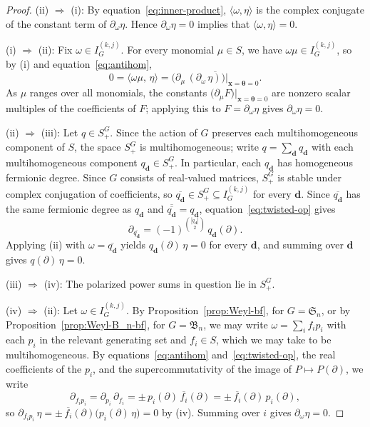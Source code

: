 \documentclass[12pt]{amsart}
\theoremstyle{plain}
\theoremstyle{definition}
\begin{document}
\begin{proof}
(ii) $\Rightarrow$ (i): By equation~\eqref{eq:inner-product}, $\langle \omega, \eta\rangle$ is the complex conjugate of the constant term of $\partial_\omega \eta$. 
Hence $\partial_\omega \eta = 0$ implies that $\langle \omega, \eta\rangle = 0$.

(i) $\Rightarrow$ (ii): Fix $\omega \in I_G^{(k,j)}$. For every monomial $\mu \in S$, we have $\omega \mu \in I_G^{(k,j)}$, so by (i) and equation~\eqref{eq:antihom},
\begin{equation}
    0 = \langle \omega\mu,\, \eta \rangle
      = \overline{\big(\partial_\mu\, (\partial_\omega\, \eta)\big)\big|_{\bm{x} = \bm{\theta} = 0}}.
\end{equation}
As $\mu$ ranges over all monomials, the constants $\big(\partial_\mu F\big)\big|_{\bm{x}=\bm{\theta}=0}$ are nonzero scalar multiples of the coefficients of $F$; applying this to $F = \partial_\omega \eta$ gives $\partial_\omega \eta = 0$.

(ii) $\Rightarrow$ (iii): Let $q \in S_+^{G}$. 
Since the action of $G$ preserves each multihomogeneous component of $S$, the space $S_+^{G}$ is multihomogeneous; write $q = \sum_{\bm{d}} q_{\bm{d}}$ with each multihomogeneous component $q_{\bm{d}} \in S_+^{G}$. 
In particular, each $q_{\bm{d}}$ has homogeneous fermionic degree.
Since $G$ consists of real-valued matrices, $S_+^{G}$ is stable under complex conjugation of coefficients, so $\overline{q_{\bm{d}}} \in S_+^{G} \subseteq I_G^{(k,j)}$ for every $\bm{d}$. 
Since $\overline{q_{\bm{d}}}$ has the same fermionic degree as $q_{\bm{d}}$ and $\overline{\overline{q_{\bm{d}}}} = q_{\bm{d}}$, equation~\eqref{eq:twisted-op} gives
\begin{equation}
    \partial_{\overline{q_{\bm{d}}}}
    = (-1)^{\binom{|q_{\bm{d}}|}{2}}\, q_{\bm{d}}(\partial).
\end{equation}
Applying (ii) with $\omega = \overline{q_{\bm{d}}}$ yields $q_{\bm{d}}(\partial)\, \eta = 0$ for every $\bm{d}$, and summing over $\bm{d}$ gives $q(\partial)\, \eta = 0$.

(iii) $\Rightarrow$ (iv): The polarized power sums in question lie in $S_+^{G}$.

(iv) $\Rightarrow$ (ii): Let $\omega \in I_G^{(k,j)}$. 
By Proposition~\ref{prop:Weyl-bf}, for $G = \mathfrak{S}_n$, or by Proposition~\ref{prop:Weyl-B_n-bf}, for $G = \mathfrak{B}_n$, we may write $\omega = \sum_i f_i p_i$ with each $p_i$ in the relevant generating set and $f_i \in S$, which we may take to be multihomogeneous. 
By equations~\eqref{eq:antihom} and~\eqref{eq:twisted-op}, the real coefficients of the $p_i$, and the supercommutativity of the image of $P \mapsto P(\partial)$, we write
\begin{equation}
    \partial_{f_i p_i} = \partial_{p_i}\, \partial_{f_i}
        = \pm\, p_i(\partial)\, \overline{f_i}(\partial)
        = \pm\, \overline{f_i}(\partial)\, p_i(\partial),
\end{equation}
so $\partial_{f_i p_i}\, \eta = \pm\, \overline{f_i}(\partial)\big(p_i(\partial)\, \eta\big) = 0$ by (iv). 
Summing over $i$ gives $\partial_\omega \eta = 0$.
\end{proof}
\end{document}

